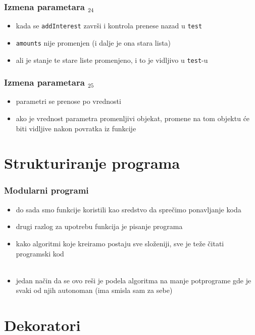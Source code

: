 \documentclass[compress]{beamer}
\begin{document}
\begin{frame}[fragile]
  \frametitle{Izmena parametara $_{24}$}
  \begin{itemize}
    \item kada se \texttt{addInterest} završi i kontrola prenese nazad u \texttt{test}
    \item \texttt{amounts} nije promenjen (i dalje je ona stara lista)
    \item ali je stanje te stare liste promenjeno, i to je vidljivo u \texttt{test}-u
  \end{itemize}
\end{frame}

\begin{frame}[fragile]
  \frametitle{Izmena parametara $_{25}$}
  \begin{itemize}
    \item parametri se  prenose po vrednosti
    \item ako je vrednost parametra promenljivi objekat, promene na tom objektu će biti vidljive nakon povratka iz funkcije
  \end{itemize}
\end{frame}

\section{Strukturiranje programa}

\begin{frame}[fragile]
  \frametitle{Modularni programi}
  \begin{itemize}
    \item do sada smo funkcije koristili kao sredstvo da sprečimo ponavljanje koda
    \item drugi razlog za upotrebu funkcija je pisanje  programa
    \item kako algoritmi koje kreiramo postaju sve složeniji, sve je teže čitati programski kod \\ \ \\
    \item jedan način da se ovo reši je podela algoritma na manje potprograme gde je svaki od njih autonoman (ima smisla sam za sebe)
  \end{itemize}
\end{frame}

\section[Dekoratori]{Dekoratori}
\end{document}

